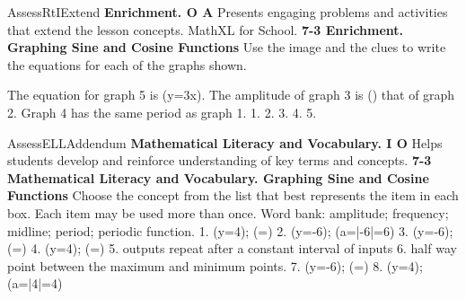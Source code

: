 \documentclass{article}
\newenvironment{te-addendum}[2]{}{}     %
\newcommand{\answer}[1]{}               %
\newcommand{\placeholder}[2]{}          %
\newcommand{\te}[1]{}                   %
\begin{document}
\begin{te-addendum}{Assess}{RtIExtend}
\textbf{Enrichment. O A}
Presents engaging problems and activities that extend the lesson concepts. MathXL for School.
\textbf{7-3 Enrichment. Graphing Sine and Cosine Functions}
Use the image and the clues to write the equations for each of the graphs shown.
\placeholder{graph}{Five numbered black/gray curves on common square grid with arrowed x,y axes and origin O; axis numbers omitted. Window inferred from clues and curves about -3pi/2 to3pi/2 in x and -4 to4 in y; vertical grid1/2 and horizontal gridpi/6. Curve1 heavy solid black -3sin x, label1 at left lower trough; curve2 solid gray 3cos(x/2), label2 at left, broad central maximum3; curve3 heavy dashed black cos2x, label3 at left near y=-1, amplitude1; curve4 gray dashed3cos x, label4 at left near y=1; curve5 black dashed3sin x, label5 at left maximum3. All continue beyond frame; overlapping curves obscure some tiny axis details.}
The equation for graph 5 is (y=3\sin x).
The amplitude of graph 3 is () that of graph 2.
Graph 4 has the same period as graph 1.
1. \answer{(y=-3\sin x) or (y=3\cos(x+\frac2\pi))}
2. \answer{(y=3\cos\frac12 x) or (y=-3\sin(\frac12 x+\frac2\pi))}
3. \answer{(y=\cos2x) or (y=-\sin(2x-\frac2\pi))}
4. \answer{(y=3\cos x) or (y=-3\sin(x-\frac2\pi))}
5. \answer{(y=3\sin x) or (y=-3\cos(x+\frac2\pi))}
\te{Printed alternate equations all use2/pi, confirmed in enlarged source. Likely intended pi/2. Item2 additionally has a sign mismatch: 3cos(x/2) equals3sin(x/2+pi/2), or -3sin(x/2-pi/2).}
\end{te-addendum}
\begin{te-addendum}{Assess}{ELLAddendum}
\textbf{Mathematical Literacy and Vocabulary. I O}
Helps students develop and reinforce understanding of key terms and concepts.
\textbf{7-3 Mathematical Literacy and Vocabulary. Graphing Sine and Cosine Functions}
Choose the concept from the list that best represents the item in each box. Each item may be used more than once.
Word bank: amplitude; frequency; midline; period; periodic function.
1. (y=4\theta); (=\frac{}) \answer{1. period}
2. (y=-6\theta); (a=|-6|=6) \answer{2. amplitude}
3. (y=-6\theta); (=\frac{}) \answer{3. period}
4. (y=4\theta); (=\pi) \answer{4. frequency}
5. outputs repeat after a constant interval of inputs \answer{5. periodic function}
6. half way point between the maximum and minimum points. \answer{6. midline}
7. (y=-6); (=\pi) \answer{7. frequency}
8. (y=4\theta); (a=|4|=4) \answer{8. amplitude}
\te{Printed item7 equation is only y=-6; likely truncated y=-6sin4theta, consistent with displayed frequency.}
\end{te-addendum}
\end{document}

